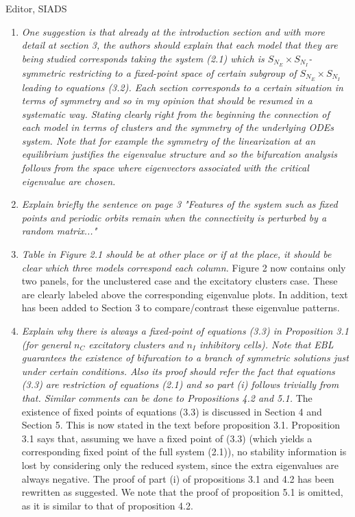 \documentclass[11pt]{letter}
\begin{document}
\begin{letter}{Editor, SIADS}
\begin{enumerate}
\item \emph{One suggestion is that already at the introduction section and with more detail at section 3, the authors should explain that each model that they are being studied corresponds taking the system (2.1) which is $S_{N_E} \times S_{N_I}$-symmetric restricting to a fixed-point space of certain subgroup of $S_{N_E} \times S_{N_I}$ leading to equations (3.2). Each section corresponds to a certain situation in terms of symmetry and so in my opinion that should be resumed in a systematic way. Stating clearly right from the beginning the connection of each model in terms of clusters and the symmetry of the underlying ODEs system. Note that for example the symmetry of the linearization at an equilibrium justifies the eigenvalue structure and so the bifurcation analysis follows from the space where eigenvectors associated with the critical eigenvalue are chosen.}
\vspace{4mm} 

\item \emph{Explain briefly the sentence on page 3 "Features of the system such as fixed points and periodic orbits remain when the connectivity is perturbed by a random matrix..."}
\vspace{4mm} 

\item \emph{Table in Figure 2.1 should be at other place or if at the place, it should be clear which three models correspond each column.} Figure 2 now contains only two panels, for the unclustered case and the excitatory clusters case. These are clearly labeled above the corresponding eigenvalue plots. In addition, text has been added to Section 3 to compare/contrast these eigenvalue patterns.
\vspace{4mm} 

\item \emph{Explain why there is always a fixed-point of equations (3.3) in Proposition 3.1 (for general $n_C$ excitatory clusters and $n_I$ inhibitory cells). Note that EBL guarantees the existence of bifurcation to a branch of symmetric solutions just under certain conditions. Also its proof should refer the fact that equations (3.3) are restriction of equations (2.1) and so part (i) follows trivially from that. Similar comments can be done to Propositions 4.2 and 5.1.}
The existence of fixed points of equations (3.3) is discussed in Section 4 and Section 5. This is now stated in the text before proposition 3.1. Proposition 3.1 says that, assuming we have a fixed point of (3.3) (which yields a corresponding fixed point of the full system (2.1)), no stability information is lost by considering only the reduced system, since the extra eigenvalues are always negative. The proof of part (i) of propositions 3.1 and 4.2 has been rewritten as suggested. We note that the proof of proposition 5.1 is omitted, as it is similar to that of proposition 4.2.
\vspace{4mm} 


\end{enumerate}
\end{letter}
\end{document}
